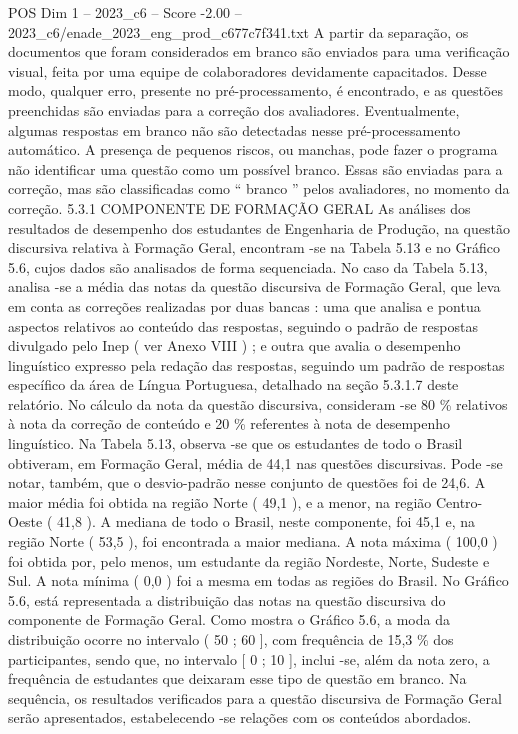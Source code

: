 \begin{textsample}{POS Dim 1 – 2023\_c6 – Score -2.00 – 2023\_c6/enade\_2023\_eng\_prod\_c677c7f341.txt}
A partir da separação, os documentos que foram considerados em branco são enviados para uma verificação visual, feita por uma equipe de colaboradores devidamente capacitados.
Desse modo, qualquer erro, presente no pré-processamento, é encontrado, e as questões preenchidas são enviadas para a correção dos avaliadores.
Eventualmente, algumas respostas em branco não são detectadas nesse pré-processamento automático.
A presença de pequenos riscos, ou manchas, pode fazer o programa não identificar uma questão como um possível branco.
Essas são enviadas para a correção, mas são classificadas como “ branco ” pelos avaliadores, no momento da correção. 5.3.1 COMPONENTE DE FORMAÇÃO GERAL As análises dos resultados de desempenho dos estudantes de Engenharia de Produção, na questão discursiva relativa à Formação Geral, encontram -se na Tabela 5.13 e no Gráfico 5.6, cujos dados são analisados de forma sequenciada.
No caso da Tabela 5.13, analisa -se a média das notas da questão discursiva de Formação Geral, que leva em conta as correções realizadas por duas bancas : uma que analisa e pontua aspectos relativos ao conteúdo das respostas, seguindo o padrão de respostas divulgado pelo Inep ( ver Anexo VIII ) ; e outra que avalia o desempenho linguístico expresso pela redação das respostas, seguindo um padrão de respostas específico da área de Língua Portuguesa, detalhado na seção 5.3.1.7 deste relatório.
No cálculo da nota da questão discursiva, consideram -se 80 \% relativos à nota da correção de conteúdo e 20 \% referentes à nota de desempenho linguístico.
Na Tabela 5.13, observa -se que os estudantes de todo o Brasil obtiveram, em Formação Geral, média de 44,1 nas questões discursivas.
Pode -se notar, também, que o desvio-padrão nesse conjunto de questões foi de 24,6.
A maior média foi obtida na região Norte ( 49,1 ), e a menor, na região Centro-Oeste ( 41,8 ).
A mediana de todo o Brasil, neste componente, foi 45,1 e, na região Norte ( 53,5 ), foi encontrada a maior mediana.
A nota máxima ( 100,0 ) foi obtida por, pelo menos, um estudante da região Nordeste, Norte, Sudeste e Sul.
A nota mínima ( 0,0 ) foi a mesma em todas as regiões do Brasil.
No Gráfico 5.6, está representada a distribuição das notas na questão discursiva do componente de Formação Geral.
Como mostra o Gráfico 5.6, a moda da distribuição ocorre no intervalo ( 50 ; 60 ], com frequência de 15,3 \% dos participantes, sendo que, no intervalo [ 0 ; 10 ], inclui -se, além da nota zero, a frequência de estudantes que deixaram esse tipo de questão em branco.
Na sequência, os resultados verificados para a questão discursiva de Formação Geral serão apresentados, estabelecendo -se relações com os conteúdos abordados.

\end{textsample}
